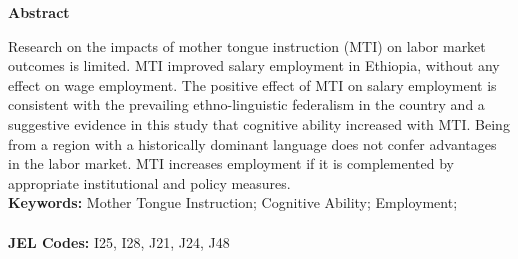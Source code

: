 \begin{center}
    \textbf{Abstract}
\end{center}
\doublespacing

Research on the impacts of mother tongue instruction (MTI) on labor market outcomes is limited. MTI improved salary employment in Ethiopia, without any effect on wage employment. The positive effect of MTI on salary employment is consistent with the prevailing ethno-linguistic federalism in the country and a suggestive evidence in this study that cognitive ability increased with MTI. Being from a region with a historically dominant language does not confer advantages in the labor market. MTI increases employment if it is complemented by appropriate institutional and policy measures.\\

\vspace{0in}
\noindent\textbf{Keywords:} Mother Tongue Instruction; Cognitive Ability; Employment;\\
\vspace{-.2in}\\
\noindent\textbf{JEL Codes:} I25, I28, J21, J24, J48\\

\bigskip

